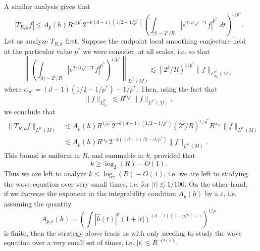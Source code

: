 %
A similar analysis gives that
%
\[ |T_{R,k} f| \lesssim A_p(h) R^{1/p^*} 2^{-k(d-1)(1/2 - 1/p^*)} \left( \int_{|t| \sim 2^k/R} |e^{2 \pi i t \sqrt{-\Delta}} f|^{p^*}\; dt \right)^{1/p^*}. \]
%
Let us analyze $T_{R,k}$ first. Suppose the endpoint local smoothing conjecture held at the particular value $p^*$ we were consider, at all scales, i.e. so that
%
\[ \left\| \left( \int_{|t| \sim 2^k / R} |e^{2 \pi i t \sqrt{-\Delta}} f|^{p^*} \right)^{1/p^*} \right\|_{L^{p^*}(M)} \lesssim (2^k/R)^{1/p^*} \| f \|_{L^{p^*}_{\alpha_{p^*}}(M)} \]
%
where $\alpha_{p^*} = (d-1)(1/2 - 1/p^*) - 1/p^*$. Then, using the fact that
%
\[ \| f \|_{L^{p^*}_{\alpha_{p^*}}} \lesssim R^{\alpha_{p^*}} \| f \|_{L^{p^*}(M)}, \]
%
we conclude that
%
\begin{align*}
    \| T_{R,k} f \|_{L^{p^*}(M)} &\lesssim A_p(h) R^{1/p^*} 2^{-k(d-1)(1/2 - 1/p^*)} (2^k / R)^{1/p^*} R^{\alpha_{p^*}} \| f \|_{L^{p^*}(M)}\\
    &\lesssim A_p(h) R^{\alpha_{p^*}} 2^{-k((d-1)/2 - d/p^*)} \| f \|_{L^{p^*}(M)}.
\end{align*}
%
This bound is uniform in $R$, and summable in $k$, provided that
%
\[ k \geq \log_2(R) - O(1). \]
%
Thus we are left to analyze $k \leq \log_2(R) - O(1)$, i.e. we are left to studying the wave equation over very small times, i.e. for $|t| \lesssim 1/100$. On the other hand, if we \emph{increase} the exponent in the integrability condition $A_p(h)$ by a $\varepsilon$, i.e. assuming the quantity
%
\[ A_{p,\varepsilon}(h) = \left( \int |\widehat{h}(t)|^p (1 + |t|)^{(d-1)(1 - p/2) + \varepsilon} \right)^{1/p} \]
%
is finite, then the strategy above leads us with only needing to study the wave equation over a very small set of times, i.e. $|t| \lesssim R^{-O(\varepsilon)}$.

\begin{comment}
%
Summing up gives
%
\[ \| T_{R,k} f \|_{L^{p^*}(M)} \lesssim R^{-1/p^*} \| f \|_{L^{p^*}(M)}. \]

Summing up this bound gives uniform bounds in $R \geq 1$. On the other hand, the ednpoint local smoothing conjecture also implies that
%
\[ \left\| \left( \int_{|t| \lesssim 1 / R} |e^{2 \pi i t \sqrt{-\Delta}} f|^{p^*} \right)^{1/p^*} \right\|_{L^{p^*}(M)} \lesssim R^{-1/p^*} \| f \|_{L^{p^*}_{\alpha_{p^*}}(M)}, \]
%
and so
%
\[ \| T_{R,0} f \|_{L^{p^*}(M)} \lesssim A_p(h) R^{\alpha_{p^*}} \| f \|_{L^{p^*}_{\alpha_{p^*}}(M)}. \]
%
This is problematic. To get the result required, we'd really like to have a `local local smoothing' estimate of the form
%
\[ \left\| \left( \int_{|t| \lesssim 1/R} |e^{2 \pi i t \sqrt{-\Delta}} f|^{p^*} \right)^{1/p^*} \right\|_{L^{p^*}(M)} \lesssim \| f \|_{L^{p^*}(M)} \]
%
as $R \to 0$.
\end{comment}

